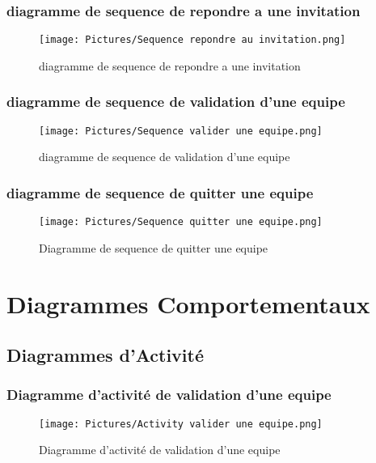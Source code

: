 \documentclass[11pt,fleqn]{book} %
\begin{document}
\subsubsection{diagramme de sequence de repondre a une invitation}
\begin{figure}[h]
    \centering
    \texttt{[image: Pictures/Sequence repondre au invitation.png]}
    \caption{diagramme de sequence de repondre a une invitation}
    \label{fig:pca}
\end{figure}
\newpage
\subsubsection{diagramme de sequence de validation d'une equipe}
\begin{figure}[h]
    \centering
    \texttt{[image: Pictures/Sequence valider une equipe.png]}
    \caption{diagramme de sequence de validation d'une equipe}
    \label{fig:pca}
\end{figure}
\newpage

\subsubsection{diagramme de sequence de quitter une equipe}
\begin{figure}[h]
    \centering
    \texttt{[image: Pictures/Sequence quitter une equipe.png]}
    \caption{Diagramme de sequence de quitter une equipe}
    \label{fig:pca}
\end{figure}
\newpage
\section{Diagrammes Comportementaux}
\subsection{Diagrammes d’Activité}

\subsubsection{Diagramme d'activité de validation d'une equipe}
\begin{figure}[h]
    \centering
    \texttt{[image: Pictures/Activity valider une equipe.png]}
    \caption{Diagramme d'activité de validation d'une equipe}
    \label{fig:pca}
\end{figure}
\newpage
\end{document}
